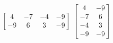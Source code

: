 {$\left[\hskip -3pt \begin{array}{cccc} 4&-7&-4&-9\\  -9&6&3&-9
\end{array}\hskip -3pt \right] $}
{$\left[\hskip -3pt \begin{array}{cc} 4&-9\\  -7&6
\\  -4&3\\  -9&-9\end{array}\hskip -3pt \right]$}


